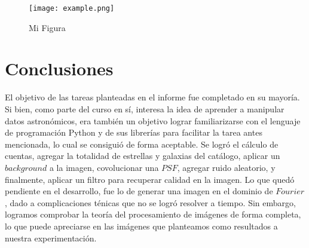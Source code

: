 \documentclass[twocolumn]{AS4201}
\begin{document}
\begin{figure}
  \centering
    \texttt{[image: example.png]}
  \caption{Mi Figura}
  \label{fig:ejemplo}
\end{figure}

\section{Conclusiones}
El objetivo de las tareas planteadas en el informe fue completado en su mayoría. Si bien, como parte del curso en sí, interesa la idea de aprender a manipular datos astronómicos, era también un objetivo lograr familiarizarse con el lenguaje de programación Python y de sus librerías para facilitar la tarea antes mencionada, lo cual se consiguió de forma aceptable. Se logró el cálculo de cuentas, agregar la totalidad de estrellas y galaxias del catálogo, aplicar un $background$ a la imagen, covolucionar una $PSF$, agregar ruido aleatorio, y finalmente, aplicar un filtro para recuperar calidad en la imagen. Lo que quedó pendiente en el desarrollo, fue lo de generar una imagen en el dominio de $Fourier$, dado a complicaciones ténicas que no se logró resolver a tiempo. Sin embargo, logramos comprobar la teoría del procesamiento de imágenes de forma completa, lo que puede apreciarse en las imágenes que planteamos como resultados a nuestra experimentación.
\end{document}
